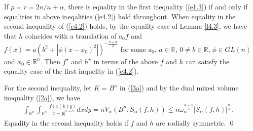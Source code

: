 \documentclass[preprint,12pt]{elsarticle}
\begin{document}
If $p=r=2n/n+\alpha $, there is equality in the first inequality (\ref{e1.3}) if and only if equalities in above ineqalities (\ref{e4.2}) hold throughout. 
When equality in the second inequality of (\ref{e4.2}) holds, by  the equality case of Lemma \ref{l4.3}, we have  that $h$ coincides with a translation of $a_{0} f$ and $f\left ( x \right )=a\left ( b ^{2}+\left | \phi \left ( x-x_{0} \right )^{2}    \right |   \right )^{-\frac{n+\alpha }{2} }$ for some $a_{0}$, $a\in \mathbb{R}$, $0\neq b \in\mathbb{R}$, $\phi\in GL(n)$ and $x_{0}\in \mathbb{R}^n$. Then $f^{\star }$ and $h^{\star }$ in terms of the above $f$ and $h$ can satisfy the equality case of the first inquelity in (\ref{e4.2}).
 
For the second inequality, let $K={B}^{n}$ in (\ref{3a}) and by the dual mixed volume inequality (\ref{2a}), we have
\begin{eqnarray*}
	\int_{\mathbb{R}^n}\int_{\mathbb{R}^n}\frac{f(x)h(y)}{{| x-y|}^{n-\alpha}}dxdy=n\widetilde{V}_{\alpha}({B}^{n},{S}_{\alpha }(f,h)) \leq n{\omega}_{n}^{\frac{n-\alpha}{n}}{|{S}_{\alpha}(f,h)|}^{\frac{\alpha}{n}}.
\end{eqnarray*} 
Equality in the second inequality holds if $f$ and $h$ are radially symmetric.
\qed
\end{document}
